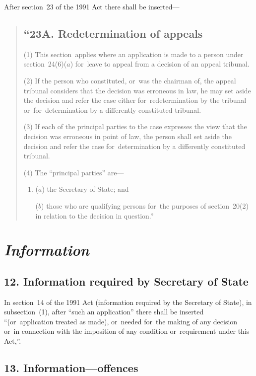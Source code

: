 \documentclass[12pt,a4paper]{article}
\begin{document}
After section~23 of the 1991 Act there shall be inserted—
\begin{quotation}
\subsection*{“23A. Redetermination of appeals}

(1) This section~applies where an application is made to a person under section~24(6)($a$)  for~leave to appeal from a decision of an appeal tribunal.

(2) If the person who constituted, or~was the chairman of, the appeal tribunal considers that the decision was erroneous in law, he may set aside the decision and refer the case either for~redetermination by the tribunal or~for~determination by a differently constituted tribunal.

(3) If each of the principal parties to the case expresses the view that the decision was erroneous in point of law, the person shall set aside the decision and refer the case for~determination by a differently constituted tribunal.

(4) The “principal parties” are—
\begin{enumerate}\item[]
($a$) the Secretary of State; and

($b$) those who are qualifying persons for~the purposes of section~20(2)  in relation to the decision in question.”
\end{enumerate}
\end{quotation}

\section{\itshape Information}

\subsection{12. Information required by Secretary of State}

In section~14 of the 1991 Act (information required by the Secretary of State), in subsection~(1), after “such an application” there shall be inserted “(or~application treated as made), or~needed for~the making of any decision or~in connection with the imposition of any condition or~requirement under this Act,”.

\subsection{13. Information—offences}
\end{document}
